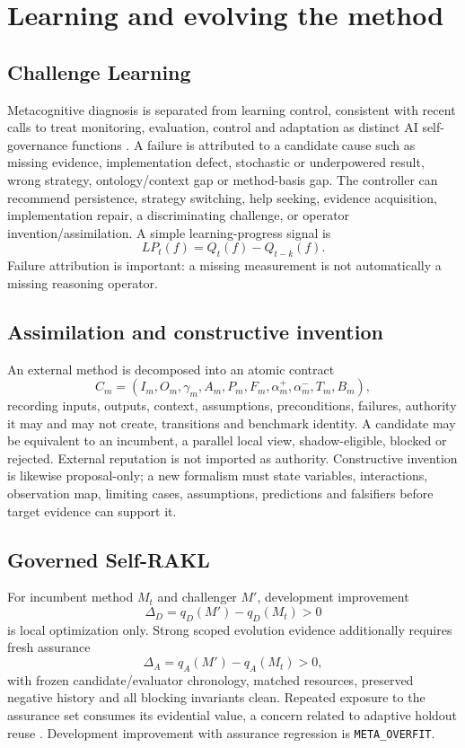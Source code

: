 \documentclass[11pt]{article}
\begin{document}
\section{Learning and evolving the method}
\subsection{Challenge Learning}
Metacognitive diagnosis is separated from learning control, consistent with recent calls to treat monitoring, evaluation, control and adaptation as distinct AI self-governance functions \cite{ji2026}. A failure is attributed to a candidate cause such as missing evidence, implementation defect, stochastic or underpowered result, wrong strategy, ontology/context gap or method-basis gap. The controller can recommend persistence, strategy switching, help seeking, evidence acquisition, implementation repair, a discriminating challenge, or operator invention/assimilation. A simple learning-progress signal is
\begin{equation}LP_t(f)=Q_t(f)-Q_{t-k}(f).\end{equation}
Failure attribution is important: a missing measurement is not automatically a missing reasoning operator.

\subsection{Assimilation and constructive invention}
An external method is decomposed into an atomic contract
\begin{equation}C_m=(I_m,O_m,\gamma_m,A_m,P_m,F_m,\alpha_m^+,\alpha_m^-,T_m,B_m),\end{equation}
recording inputs, outputs, context, assumptions, preconditions, failures, authority it may and may not create, transitions and benchmark identity. A candidate may be equivalent to an incumbent, a parallel local view, shadow-eligible, blocked or rejected. External reputation is not imported as authority. Constructive invention is likewise proposal-only; a new formalism must state variables, interactions, observation map, limiting cases, assumptions, predictions and falsifiers before target evidence can support it.

\subsection{Governed Self-RAKL}
For incumbent method $M_t$ and challenger $M'$, development improvement
\begin{equation}\Delta_D=q_D(M')-q_D(M_t)>0\end{equation}
is local optimization only. Strong scoped evolution evidence additionally requires fresh assurance
\begin{equation}\Delta_A=q_A(M')-q_A(M_t)>0,\end{equation}
with frozen candidate/evaluator chronology, matched resources, preserved negative history and all blocking invariants clean. Repeated exposure to the assurance set consumes its evidential value, a concern related to adaptive holdout reuse \cite{dwork2015}. Development improvement with assurance regression is \texttt{META\_OVERFIT}.
\end{document}
